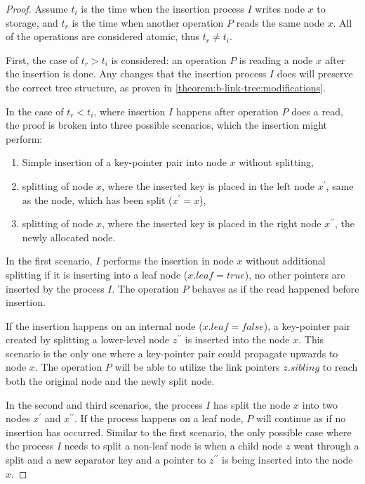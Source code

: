 \begin{proof}
  Assume $t_i$ is the time when the insertion process $I$ writes node $x$ to storage, and $t_r$ is the time when another operation $P$ reads the same node $x$. All of the operations are considered atomic, thus $t_r \neq t_i$.

  First, the case of $t_r > t_i$ is considered: an operation $P$ is reading a node $x$ after the insertion is done. Any changes that the insertion process $I$ does will preserve the correct tree structure, as proven in \cref{theorem:b-link-tree:modifications}.

  In the case of $t_r < t_i$, where insertion $I$ happens after operation $P$ does a read, the proof is broken into three possible scenarios, which the insertion might perform:

  \begin{enumerate}
    \item Simple insertion of a key-pointer pair into node $x$ without splitting,
    \item splitting of node $x$, where the inserted key is placed in the left node $x^\prime$, same as the node, which has been split ($x^\prime = x$),
    \item splitting of node $x$, where the inserted key is placed in the right node $x^{\prime\prime}$, the newly allocated node.
  \end{enumerate}

  In the first scenario, $I$ performs the insertion in node $x$ without additional splitting if it is inserting into a leaf node ($x.\mathit{leaf} = \mathit{true}$), no other pointers are inserted by the process $I$. The operation $P$ behaves as if the read happened before insertion.

  If the insertion happens on an internal node ($x.\mathit{leaf} = \mathit{false}$), a key-pointer pair created by splitting a lower-level node $z^{\prime\prime}$ is inserted into the node $x$. This scenario is the only one where a key-pointer pair could propagate upwards to node $x$. The operation $P$ will be able to utilize the link pointers $z.\mathit{sibling}$ to reach both the original node and the newly split node.

  In the second and third scenarios, the process $I$ has split the node $x$ into two nodes $x^\prime$ and $x^{\prime\prime}$. If the process happens on a leaf node, $P$ will continue as if no insertion has occurred. Similar to the first scenario, the only possible case where the process $I$ needs to split a non-leaf node is when a child node $z$ went through a split and a new separator key and a pointer to $z^{\prime\prime}$ is being inserted into the node $x$.


\end{proof}
